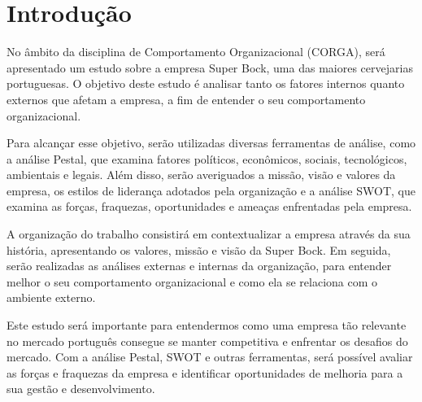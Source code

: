 \chapter*{Introdução}

No âmbito da disciplina de Comportamento Organizacional (CORGA), será apresentado um estudo sobre a empresa Super Bock, uma das maiores cervejarias portuguesas. O objetivo deste estudo é analisar tanto os fatores internos quanto externos que afetam a empresa, a fim de entender o seu comportamento organizacional.



Para alcançar esse objetivo, serão utilizadas diversas ferramentas de análise, como a análise Pestal, que examina fatores políticos, econômicos, sociais, tecnológicos, ambientais e legais. Além disso, serão averiguados a missão, visão e valores da empresa, os estilos de liderança adotados pela organização e a análise SWOT, que examina as forças, fraquezas, oportunidades e ameaças enfrentadas pela empresa.



A organização do trabalho consistirá em contextualizar a empresa através da sua história, apresentando os valores, missão e visão da Super Bock. Em seguida, serão realizadas as análises externas e internas da organização, para entender melhor o seu comportamento organizacional e como ela se relaciona com o ambiente externo.



Este estudo será importante para entendermos como uma empresa tão relevante no mercado português consegue se manter competitiva e enfrentar os desafios do mercado. Com a análise Pestal, SWOT e outras ferramentas, será possível avaliar as forças e fraquezas da empresa e identificar oportunidades de melhoria para a sua gestão e desenvolvimento.
